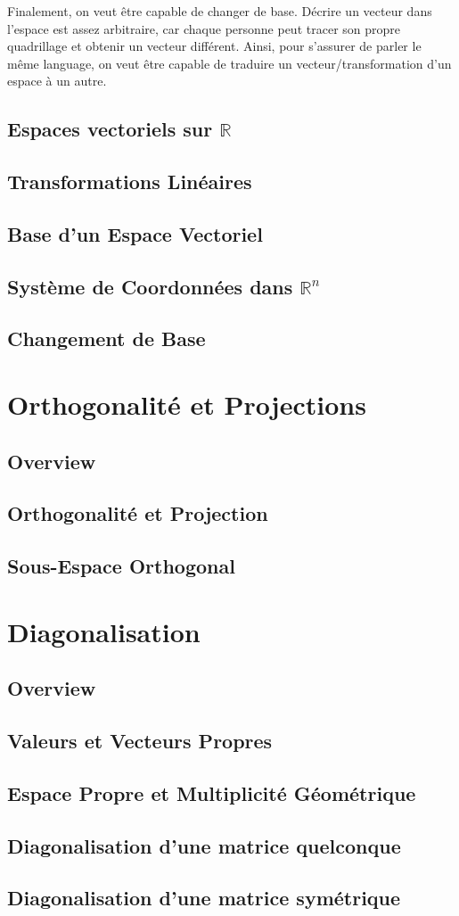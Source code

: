 \documentclass{article}
\begin{document}
Finalement, on veut être capable de changer de base. Décrire un vecteur dans
l'espace est assez arbitraire, car chaque personne peut tracer son propre quadrillage
et obtenir un vecteur différent. Ainsi, pour s'assurer de parler le même language,
on veut être capable de traduire un vecteur/transformation d'un espace à un autre.

\subsection{Espaces vectoriels sur $\mathbb{R}$}
\subsection{Transformations Linéaires}
\subsection{Base d'un Espace Vectoriel}
\subsection{Système de Coordonnées dans $\mathbb{R}^n$}
\subsection{Changement de Base}

\pagebreak
\section{Orthogonalité et Projections}
\subsection{Overview}

\subsection{Orthogonalité et Projection}
\subsection{Sous-Espace Orthogonal}

\pagebreak

\section{Diagonalisation}
\subsection{Overview}
\subsection{Valeurs et Vecteurs Propres}
\subsection{Espace Propre et Multiplicité Géométrique}
\subsection{Diagonalisation d'une matrice quelconque}
\subsection{Diagonalisation d'une matrice symétrique}

\pagebreak
\end{document}
